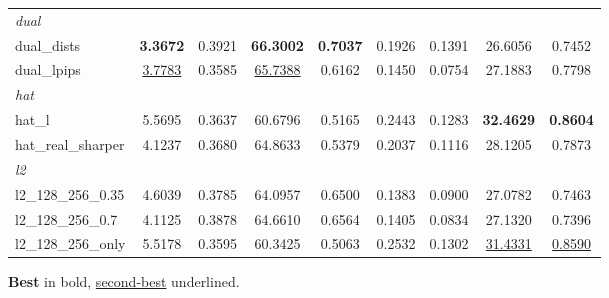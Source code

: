 \begin{table}[t]
{\begin{tabular}{lcccccccc}
    \midrule
    \multicolumn{9}{l}{\textit{dual}} \\
    dual\_dists & \textbf{3.3672} & 0.3921 & \textbf{66.3002} & \textbf{0.7037} & 0.1926 & 0.1391 & 26.6056 & 0.7452 \\
    dual\_lpips & \underline{3.7783} & 0.3585 & \underline{65.7388} & 0.6162 & 0.1450 & 0.0754 & 27.1883 & 0.7798 \\
    \midrule
    \multicolumn{9}{l}{\textit{hat}} \\
    hat\_l & 5.5695 & 0.3637 & 60.6796 & 0.5165 & 0.2443 & 0.1283 & \textbf{32.4629} & \textbf{0.8604} \\
    hat\_real\_sharper & 4.1237 & 0.3680 & 64.8633 & 0.5379 & 0.2037 & 0.1116 & 28.1205 & 0.7873 \\
    \midrule
    \multicolumn{9}{l}{\textit{l2}} \\
    l2\_128\_256\_0.35 & 4.6039 & 0.3785 & 64.0957 & 0.6500 & 0.1383 & 0.0900 & 27.0782 & 0.7463 \\
    l2\_128\_256\_0.7 & 4.1125 & 0.3878 & 64.6610 & 0.6564 & 0.1405 & 0.0834 & 27.1320 & 0.7396 \\
    l2\_128\_256\_only & 5.5178 & 0.3595 & 60.3425 & 0.5063 & 0.2532 & 0.1302 & \underline{31.4331} & \underline{0.8590} \\
    \bottomrule
  \end{tabular}%
  }
  \vspace{2pt}
  \footnotesize{\textbf{Best} in bold, \underline{second-best} underlined.}
\end{table}

